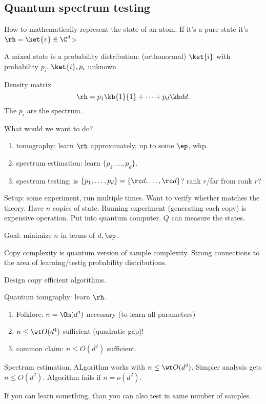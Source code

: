 \subsection{Quantum spectrum testing}

How to mathematically represent the state of an atom. If it's a pure state it's $\rh=\ket{v}\in \C^d$> 

A mixed state is a probability distribution: (orthonormal) $\ket{i}$ with probability $p_i$. $\ket{i},p_i$ unknown

Density matrix
\[
\rh=p_1\kb{1}{1}+\cdots +p_d\kb dd.
\]
The $p_i$ are the spectrum. 

What would we want to do? 
\begin{enumerate}
\item
tomography: learn $\rh$ approximately, up to some $\ep$, whp.
\item
spectrum estimation: learn $\{p_1,\ldots, p_d\}$.
\item
spectrum testing: is $\{p_1,\ldots, p_d\}=\{\rc d,\ldots, \rc d\}$? rank $r$/far from rank $r$?
\end{enumerate}

Setup: some experiment, run multiple times. Want to verify whether matches the theory. Have $n$ copies of state. Running experiment (generating each copy) is expensive operation. Put into quantum computer. $Q$ can measure the states.

Goal: minimize $n$ in terms of $d,\ep$.

Copy complexity is quantum version of sample complexity. Strong connections to the area of learning/testig probability distributions.

Design copy efficient algorithms.

Quantum tomgraphy: learn $\rh$.
\begin{enumerate}
\item
Folklore: $n=\Om(d^2)$ necessary (to learn all parameters)
\item
$n\le \wt O(d^4)$ sufficient (quadratic gap)!
\item
common claim: $n\le O(d^2)$ sufficient.
\end{enumerate}

Spectrum estimation. ALgorithm works with $n\le \wt O(d^2)$. Simpler analysis gets $n\le O(d^2)$. Algorithm fails if $n=o(d^2)$.

If you can learn something, than you can also test in same number of samples.

